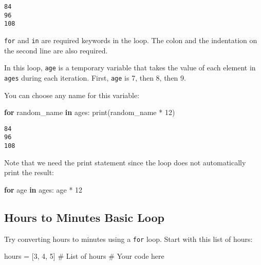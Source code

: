 \documentclass[
  letterpaper,
  DIV=11,
  numbers=noendperiod]{scrreprt}
\newenvironment{Shaded}{\begin{snugshade}}{\end{snugshade}}
\newcommand{\BuiltInTok}[1]{\textcolor[rgb]{0.00,0.23,0.31}{#1}}
\newcommand{\CommentTok}[1]{\textcolor[rgb]{0.37,0.37,0.37}{#1}}
\newcommand{\ControlFlowTok}[1]{\textcolor[rgb]{0.00,0.23,0.31}{\textbf{#1}}}
\newcommand{\DecValTok}[1]{\textcolor[rgb]{0.68,0.00,0.00}{#1}}
\newcommand{\KeywordTok}[1]{\textcolor[rgb]{0.00,0.23,0.31}{\textbf{#1}}}
\newcommand{\NormalTok}[1]{\textcolor[rgb]{0.00,0.23,0.31}{#1}}
\newcommand{\OperatorTok}[1]{\textcolor[rgb]{0.37,0.37,0.37}{#1}}
\begin{document}
\begin{verbatim}
84
96
108
\end{verbatim}

\texttt{for} and \texttt{in} are required keywords in the loop. The
colon and the indentation on the second line are also required.

In this loop, \texttt{age} is a temporary variable that takes the value
of each element in \texttt{ages} during each iteration. First,
\texttt{age} is 7, then 8, then 9.

You can choose any name for this variable:

\begin{Shaded}
\begin{Highlighting}[]
\ControlFlowTok{for}\NormalTok{ random\_name }\KeywordTok{in}\NormalTok{ ages:}
    \BuiltInTok{print}\NormalTok{(random\_name }\OperatorTok{*} \DecValTok{12}\NormalTok{)}
\end{Highlighting}
\end{Shaded}

\begin{verbatim}
84
96
108
\end{verbatim}

Note that we need the print statement since the loop does not
automatically print the result:

\begin{Shaded}
\begin{Highlighting}[]
\ControlFlowTok{for}\NormalTok{ age }\KeywordTok{in}\NormalTok{ ages:}
\NormalTok{    age }\OperatorTok{*} \DecValTok{12}
\end{Highlighting}
\end{Shaded}

\begin{tcolorbox}[enhanced jigsaw, colframe=quarto-callout-tip-color-frame, opacityback=0, titlerule=0mm, bottomrule=.15mm, breakable, leftrule=.75mm, colbacktitle=quarto-callout-tip-color!10!white, title=\textcolor{quarto-callout-tip-color}{\faLightbulb}\hspace{0.5em}{Practice}, rightrule=.15mm, coltitle=black, opacitybacktitle=0.6, colback=white, left=2mm, arc=.35mm, toptitle=1mm, bottomtitle=1mm, toprule=.15mm]

\subsection{Hours to Minutes Basic
Loop}\label{hours-to-minutes-basic-loop}

Try converting hours to minutes using a \texttt{for} loop. Start with
this list of hours:

\begin{Shaded}
\begin{Highlighting}[]
\NormalTok{hours }\OperatorTok{=}\NormalTok{ [}\DecValTok{3}\NormalTok{, }\DecValTok{4}\NormalTok{, }\DecValTok{5}\NormalTok{]  }\CommentTok{\# List of hours}
\CommentTok{\# Your code here}
\end{Highlighting}
\end{Shaded}

\end{tcolorbox}
\end{document}
